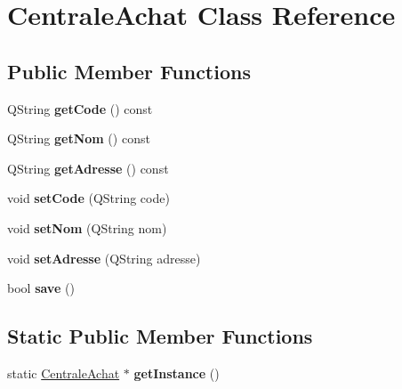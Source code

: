 \hypertarget{class_centrale_achat}{
\section{CentraleAchat Class Reference}
\label{class_centrale_achat}
}
\subsection*{Public Member Functions}
\begin{DoxyCompactItemize}
\item 
\hypertarget{class_centrale_achat_a602e6d4322283e60f86025d914cca6cf}{
QString {\bfseries getCode} () const }
\label{class_centrale_achat_a602e6d4322283e60f86025d914cca6cf}

\item 
\hypertarget{class_centrale_achat_a295209796a31cba5282e74016c5aac73}{
QString {\bfseries getNom} () const }
\label{class_centrale_achat_a295209796a31cba5282e74016c5aac73}

\item 
\hypertarget{class_centrale_achat_a8ca22e3e7442a4b745645b088ec57a29}{
QString {\bfseries getAdresse} () const }
\label{class_centrale_achat_a8ca22e3e7442a4b745645b088ec57a29}

\item 
\hypertarget{class_centrale_achat_ab810a1b8190a13cc97680526ef4e25dc}{
void {\bfseries setCode} (QString code)}
\label{class_centrale_achat_ab810a1b8190a13cc97680526ef4e25dc}

\item 
\hypertarget{class_centrale_achat_adcd903cff04ad07ef524c5b1744149fb}{
void {\bfseries setNom} (QString nom)}
\label{class_centrale_achat_adcd903cff04ad07ef524c5b1744149fb}

\item 
\hypertarget{class_centrale_achat_a67921d14e0704ee0574ab8f6c8d5b1ba}{
void {\bfseries setAdresse} (QString adresse)}
\label{class_centrale_achat_a67921d14e0704ee0574ab8f6c8d5b1ba}

\item 
\hypertarget{class_centrale_achat_a6bc25defd3ed9d0502e48bbb99823b87}{
bool {\bfseries save} ()}
\label{class_centrale_achat_a6bc25defd3ed9d0502e48bbb99823b87}

\end{DoxyCompactItemize}
\subsection*{Static Public Member Functions}
\begin{DoxyCompactItemize}
\item 
\hypertarget{class_centrale_achat_a37c804f07ef285da8ba58a2a6020335f}{
static \hyperlink{class_centrale_achat}{CentraleAchat} $\ast$ {\bfseries getInstance} ()}
\label{class_centrale_achat_a37c804f07ef285da8ba58a2a6020335f}

\end{DoxyCompactItemize}


